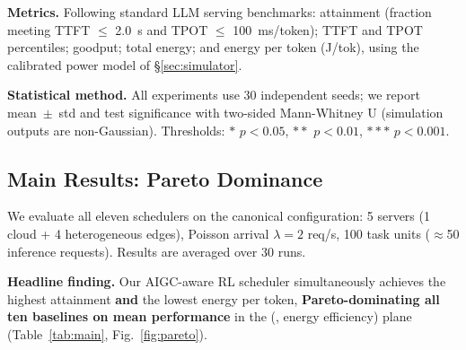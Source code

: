 \textbf{Metrics.} Following standard LLM serving benchmarks:
\slo{} attainment (fraction meeting TTFT $\le$ 2.0~s and TPOT
$\le$ 100~ms/token); TTFT and TPOT percentiles;
goodput; total energy; and energy per
token (J/tok), using the calibrated power model of
\S\ref{sec:simulator}.

\textbf{Statistical method.} All experiments use 30
independent seeds; we report mean~$\pm$~std and test
significance with two-sided Mann-Whitney U (simulation
outputs are non-Gaussian). Thresholds:
$*$ $p<0.05$, $**$ $p<0.01$, $***$ $p<0.001$.

\subsection{Main Results: Pareto Dominance}
\label{sec:main-results}

We evaluate all eleven schedulers on the canonical configuration:
5 servers (1 cloud + 4 heterogeneous edges), Poisson arrival
$\lambda{=}2$ req/s, 100 task units ($\approx$50 inference
requests). Results are averaged over 30 runs.

\textbf{Headline finding.} Our AIGC-aware RL scheduler
simultaneously achieves the highest \slo{} attainment
\textbf{and} the lowest energy per token, \textbf{Pareto-dominating
all ten baselines on mean performance} in the (\slo, energy
efficiency) plane
(Table~\ref{tab:main}, Fig.~\ref{fig:pareto}).

